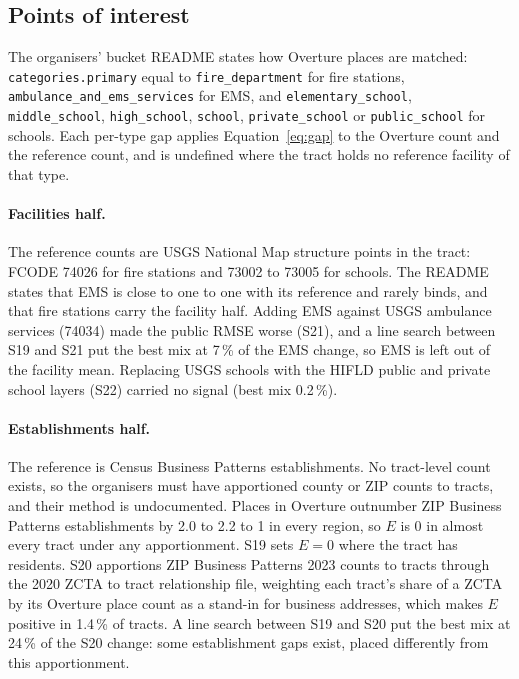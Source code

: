 \documentclass[11pt]{article}
\begin{document}
\subsection{Points of interest}

The organisers' bucket README states how Overture places are matched:
\texttt{categories.primary} equal to \texttt{fire\_department} for fire
stations, \texttt{ambulance\_and\_ems\_services} for EMS, and
\texttt{elementary\_school}, \texttt{middle\_school}, \texttt{high\_school},
\texttt{school}, \texttt{private\_school} or \texttt{public\_school} for
schools. Each per-type gap applies Equation~\ref{eq:gap} to the Overture
count and the reference count, and is undefined where the tract holds no
reference facility of that type.

\paragraph{Facilities half.} The reference counts are USGS National Map
structure points in the tract: FCODE 74026 for fire stations and 73002 to
73005 for schools. The README states that EMS is close to one to one with its
reference and rarely binds, and that fire stations carry the facility half.
Adding EMS against USGS ambulance services (74034) made the public RMSE worse
(S21), and a line search between S19 and S21 put the best mix at 7\,\% of the
EMS change, so EMS is left out of the facility mean. Replacing USGS schools
with the HIFLD public and private school layers (S22) carried no signal
(best mix 0.2\,\%).

\paragraph{Establishments half.} The reference is Census Business Patterns
establishments. No tract-level count exists, so the organisers must have
apportioned county or ZIP counts to tracts, and their method is undocumented.
Places in Overture outnumber ZIP Business Patterns establishments by 2.0 to
2.2 to 1 in every region, so $E$ is 0 in almost every tract under any
apportionment. S19 sets $E = 0$ where the tract has residents. S20 apportions
ZIP Business Patterns 2023 counts to tracts through the 2020 ZCTA to tract
relationship file, weighting each tract's share of a ZCTA by its Overture
place count as a stand-in for business addresses, which makes $E$ positive in
1.4\,\% of tracts. A line search between S19 and S20 put the best mix at
24\,\% of the S20 change: some establishment gaps exist, placed differently
from this apportionment.
\end{document}
